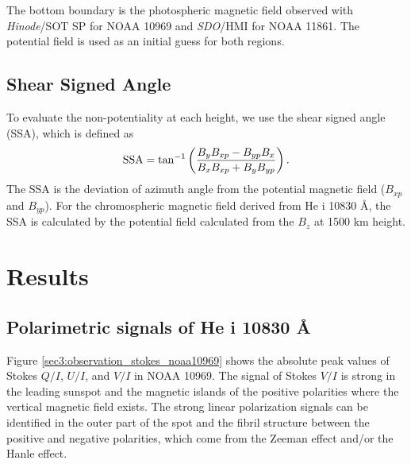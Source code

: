 \documentclass[manuscript]{aastex61}
\begin{document}
The bottom boundary is the photospheric magnetic field observed with {\it
Hinode}/SOT SP for NOAA 10969 and {\it SDO}/HMI for NOAA 11861. The potential
field is used as an initial guess for both regions.



\subsection{Shear Signed Angle}
To evaluate the non-potentiality at each height, we use the shear signed angle (SSA), which is defined as
\begin{equation}
{\rm SSA}=\tan^{-1}\left(\frac{B_yB_{xp}-B_{yp}B_x}{B_xB_{xp}+B_yB_{yp}}\right) .
\end{equation}
The SSA is the deviation of azimuth angle from the potential magnetic field ($B_{xp}$ and $B_{yp}$).
For the chromospheric magnetic field derived from He {\sc i} 10830 \AA, the SSA is calculated by the 
potential field calculated from the $B_z$ at 1500 km height.

\section{Results}

\subsection{Polarimetric signals of He {\sc i} 10830 \AA}

Figure \ref{sec3:observation_stokes_noaa10969} shows the absolute peak values of
Stokes $Q/I$, $U/I$, and $V/I$ in NOAA 10969. The signal of Stokes $V/I$ is strong in the
leading sunspot and the magnetic islands of the positive polarities where the
vertical magnetic field exists. The strong linear polarization signals can be identified in
the outer part of the spot and the fibril structure between the positive and
negative polarities, which come from the Zeeman effect and/or the Hanle effect.
\end{document}
